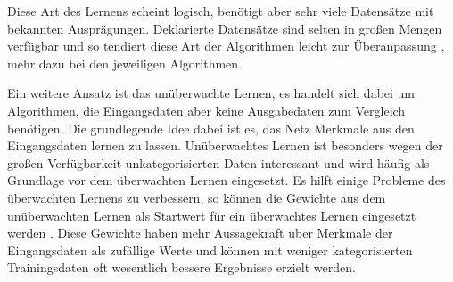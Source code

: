 Diese Art des Lernens scheint logisch, benötigt aber sehr viele Datensätze mit bekannten Ausprägungen. Deklarierte Datensätze sind selten in großen Mengen verfügbar und so tendiert diese Art der Algorithmen leicht zur Überanpassung \citep{overfitting}, mehr dazu bei den jeweiligen Algorithmen.

Ein weitere Ansatz ist das unüberwachte Lernen, es handelt sich dabei um Algorithmen, die Eingangsdaten aber keine Ausgabedaten zum Vergleich benötigen. Die grundlegende Idee dabei ist es, das Netz Merkmale aus den Eingangsdaten lernen zu lassen. Unüberwachtes Lernen ist besonders wegen der großen Verfügbarkeit unkategorisierten Daten interessant und wird häufig als Grundlage vor dem überwachten Lernen eingesetzt. Es hilft einige Probleme des überwachten Lernens zu verbessern, so können die Gewichte aus dem unüberwachten Lernen als Startwert für ein überwachtes Lernen eingesetzt werden \citep{preunsupervised}. Diese Gewichte haben mehr Aussagekraft über Merkmale der Eingangsdaten als zufällige Werte und können mit weniger kategorisierten Trainingsdaten oft wesentlich bessere Ergebnisse erzielt werden.